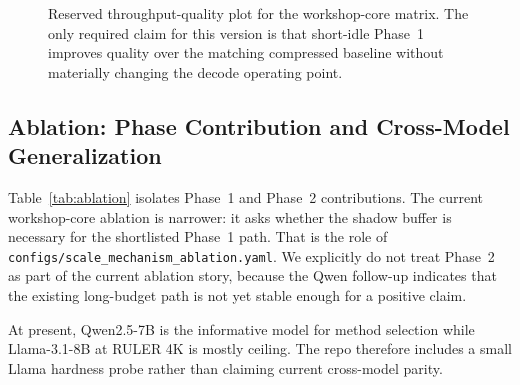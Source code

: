 \documentclass[10pt,twocolumn,letterpaper]{article}
\begin{document}
\begin{figure}[t]
\centering
{}
\caption{Reserved throughput-quality plot for the workshop-core matrix.
The only required claim for this version is that short-idle Phase~1 improves
quality over the matching compressed baseline without materially changing the
decode operating point.}
\label{fig:pareto}
\end{figure}

\subsection{Ablation: Phase Contribution and Cross-Model Generalization}

Table~\ref{tab:ablation} isolates Phase~1 and Phase~2 contributions.
The current workshop-core ablation is narrower: it asks whether the shadow
buffer is necessary for the shortlisted Phase~1 path.
That is the role of \texttt{configs/scale\_mechanism\_ablation.yaml}.
We explicitly do not treat Phase~2 as part of the current ablation story,
because the Qwen follow-up indicates that the existing long-budget path is not
yet stable enough for a positive claim.

\begin{table}[t]
\centering
\caption{Reserved mechanism ablation slot for the workshop-core matrix.
The active question is whether the shadow buffer matters for the shortlisted
Phase~1 @ 100\,ms path.}
\label{tab:ablation}
\end{table}

At present, Qwen2.5-7B is the informative model for method selection while
Llama-3.1-8B at RULER 4K is mostly ceiling. The repo therefore includes a small
Llama hardness probe rather than claiming current cross-model parity.
\end{document}
